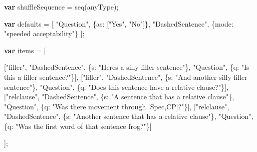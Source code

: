 \documentclass[
]{article}
\newenvironment{Shaded}{}{}
\newcommand{\DataTypeTok}[1]{\textcolor[rgb]{0.56,0.13,0.00}{#1}}
\newcommand{\FunctionTok}[1]{\textcolor[rgb]{0.02,0.16,0.49}{#1}}
\newcommand{\KeywordTok}[1]{\textcolor[rgb]{0.00,0.44,0.13}{\textbf{#1}}}
\newcommand{\NormalTok}[1]{#1}
\newcommand{\OperatorTok}[1]{\textcolor[rgb]{0.40,0.40,0.40}{#1}}
\newcommand{\StringTok}[1]{\textcolor[rgb]{0.25,0.44,0.63}{#1}}
\begin{document}
\begin{Shaded}
\begin{Highlighting}[]
    \KeywordTok{var}\NormalTok{ shuffleSequence }\OperatorTok{=} \FunctionTok{seq}\NormalTok{(anyType)}\OperatorTok{;}

    \KeywordTok{var}\NormalTok{ defaults }\OperatorTok{=}\NormalTok{ [}
        \StringTok{"Question"}\OperatorTok{,}\NormalTok{ \{}\DataTypeTok{as}\OperatorTok{:}\NormalTok{ [}\StringTok{"Yes"}\OperatorTok{,} \StringTok{"No"}\NormalTok{]\}}\OperatorTok{,}
        \StringTok{"DashedSentence"}\OperatorTok{,}\NormalTok{ \{}\DataTypeTok{mode}\OperatorTok{:} \StringTok{"speeded acceptability"}\NormalTok{\}}
\NormalTok{    ]}\OperatorTok{;}

    \KeywordTok{var}\NormalTok{ items }\OperatorTok{=}\NormalTok{ [}

\NormalTok{    [}\StringTok{"filler"}\OperatorTok{,} \StringTok{"DashedSentence"}\OperatorTok{,}\NormalTok{ \{}\DataTypeTok{s}\OperatorTok{:} \StringTok{"Here\textquotesingle{}s a silly filler sentence"}\NormalTok{\}}\OperatorTok{,}
               \StringTok{"Question"}\OperatorTok{,}\NormalTok{ \{}\DataTypeTok{q}\OperatorTok{:} \StringTok{"Is this a filler sentence?"}\NormalTok{\}]}\OperatorTok{,}
\NormalTok{    [}\StringTok{"filler"}\OperatorTok{,} \StringTok{"DashedSentence"}\OperatorTok{,}\NormalTok{ \{}\DataTypeTok{s}\OperatorTok{:} \StringTok{"And another silly filler sentence"}\NormalTok{\}}\OperatorTok{,}
               \StringTok{"Question"}\OperatorTok{,}\NormalTok{ \{}\DataTypeTok{q}\OperatorTok{:} \StringTok{"Does this sentence have a relative clause?"}\NormalTok{\}]}\OperatorTok{,}
\NormalTok{    [}\StringTok{"relclause"}\OperatorTok{,} \StringTok{"DashedSentence"}\OperatorTok{,}\NormalTok{ \{}\DataTypeTok{s}\OperatorTok{:} \StringTok{"A sentence that has a relative clause"}\NormalTok{\}}\OperatorTok{,}
                  \StringTok{"Question"}\OperatorTok{,}\NormalTok{ \{}\DataTypeTok{q}\OperatorTok{:} \StringTok{"Was there movement through [Spec,CP]?"}\NormalTok{\}]}\OperatorTok{,}
\NormalTok{    [}\StringTok{"relclause"}\OperatorTok{,} \StringTok{"DashedSentence"}\OperatorTok{,}\NormalTok{ \{}\DataTypeTok{s}\OperatorTok{:} \StringTok{"Another sentence that has a relative clause"}\NormalTok{\}}\OperatorTok{,}
                  \StringTok{"Question"}\OperatorTok{,}\NormalTok{ \{}\DataTypeTok{q}\OperatorTok{:} \StringTok{"Was the first word of that sentence \textquotesingle{}frog\textquotesingle{}?"}\NormalTok{\}]}

\NormalTok{    ]}\OperatorTok{;}
\end{Highlighting}
\end{Shaded}
\end{document}
